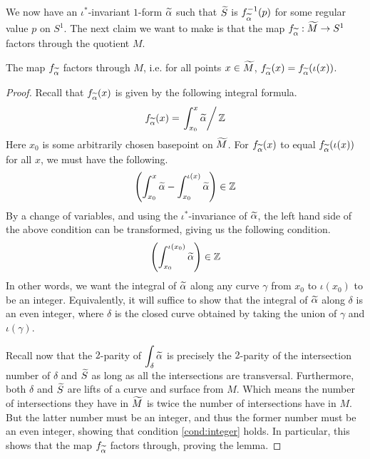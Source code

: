 We now have an $\iota^{\ast}$-invariant $1$-form $\widetilde{\alpha}$ such that $\widetilde{S}$ is
$f_{\widetilde{\alpha}}^{-1}(p)$ for some regular value $p$ on $S^1$. The next claim we want to make is that
the map $f_{\widetilde{\alpha}}: \widetilde{M} \to S^1$ factors through the quotient $M$.
\begin{lem}
  \label{lem:PD2}
  The map $f_{\widetilde{\alpha}}$ factors through $M$, i.e. for all points $x \in \widetilde{M}$, $f_{\widetilde{\alpha}}(x) = f_{\widetilde{\alpha}}(\iota (x))$.
\end{lem}
\begin{proof}
  Recall that $f_{\widetilde{\alpha}}(x)$ is given by the following integral formula.
  \begin{align*}
    f_{\widetilde{\alpha}}(x) = \left. \int_{x_0}^x \widetilde{\alpha} \right/ \mathbb{Z}
  \end{align*}
  Here $x_0$ is some arbitrarily chosen basepoint on $\widetilde{M}$. For $f_{\widetilde{\alpha}}(x)$ to equal
  $f_{\widetilde{\alpha}}(\iota(x))$ for all $x$, we must have the following.
  \begin{align*}
    \left(  \int_{x_0}^x \widetilde{\alpha} - \int_{x_0}^{\iota(x)} \widetilde{\alpha} \right) \in \mathbb{Z}
  \end{align*}
  By a change of variables, and using the $\iota^{\ast}$-invariance of $\widetilde{\alpha}$, the left hand
  side of the above condition can be transformed, giving us the following condition.
  \begin{align}
    \label{cond:integer}
    \left( \int_{x_0}^{\iota(x_0)} \widetilde{\alpha} \right) \in \mathbb{Z}
  \end{align}
  In other words, we want the integral of $\widetilde{\alpha}$ along any curve $\gamma$ from $x_0$ to
  $\iota(x_0)$ to be an integer. Equivalently, it will suffice to show that the integral of
  $\widetilde{\alpha}$ along $\delta$ is an even integer, where $\delta$ is the closed curve obtained by taking
  the union of $\gamma$ and $\iota(\gamma)$.

  Recall now that the $2$-parity of $\displaystyle \int_{\delta} \widetilde{\alpha}$ is precisely the $2$-parity
  of the intersection number of $\delta$ and $\widetilde{S}$ as long as all the intersections are
  transversal. Furthermore, both $\delta$ and $\widetilde{S}$ are lifts of a curve and surface from
  $M$. Which means the number of intersections they have in $\widetilde{M}$ is twice the number of
  intersections have in $M$. But the latter number must be an integer, and thus the former number
  must be an even integer, showing that condition \eqref{cond:integer} holds. In particular,
  this shows that the map $f_{\widetilde{\alpha}}$ factors through, proving the lemma.
\end{proof}
